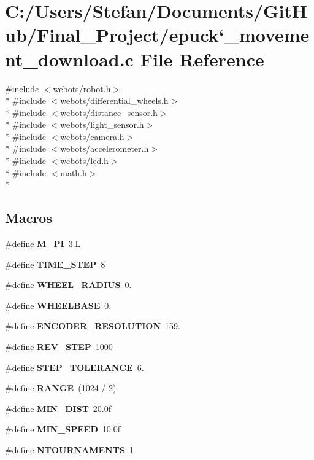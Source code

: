 \section{C\-:/\-Users/\-Stefan/\-Documents/\-Git\-Hub/\-Final\-\_\-\-Project/epuck`\-\_\-movement\-\_\-download.c File Reference}
\label{epuck`__movement__download_8c}
{\ttfamily \#include $<$webots/robot.\-h$>$}\\*
{\ttfamily \#include $<$webots/differential\-\_\-wheels.\-h$>$}\\*
{\ttfamily \#include $<$webots/distance\-\_\-sensor.\-h$>$}\\*
{\ttfamily \#include $<$webots/light\-\_\-sensor.\-h$>$}\\*
{\ttfamily \#include $<$webots/camera.\-h$>$}\\*
{\ttfamily \#include $<$webots/accelerometer.\-h$>$}\\*
{\ttfamily \#include $<$webots/led.\-h$>$}\\*
{\ttfamily \#include $<$math.\-h$>$}\\*
\subsection*{Macros}
\begin{DoxyCompactItemize}
\item 
\#define {\bf M\-\_\-\-P\-I}~3.\-L
\item 
\#define {\bf T\-I\-M\-E\-\_\-\-S\-T\-E\-P}~8
\item 
\#define {\bf W\-H\-E\-E\-L\-\_\-\-R\-A\-D\-I\-U\-S}~0.
\item 
\#define {\bf W\-H\-E\-E\-L\-B\-A\-S\-E}~0.
\item 
\#define {\bf E\-N\-C\-O\-D\-E\-R\-\_\-\-R\-E\-S\-O\-L\-U\-T\-I\-O\-N}~159.
\item 
\#define {\bf R\-E\-V\-\_\-\-S\-T\-E\-P}~1000
\item 
\#define {\bf S\-T\-E\-P\-\_\-\-T\-O\-L\-E\-R\-A\-N\-C\-E}~6.
\item 
\#define {\bf R\-A\-N\-G\-E}~(1024 / 2)
\item 
\#define {\bf M\-I\-N\-\_\-\-D\-I\-S\-T}~20.\-0f
\item 
\#define {\bf M\-I\-N\-\_\-\-S\-P\-E\-E\-D}~10.\-0f
\item 
\#define {\bf N\-T\-O\-U\-R\-N\-A\-M\-E\-N\-T\-S}~1
\end{DoxyCompactItemize}
